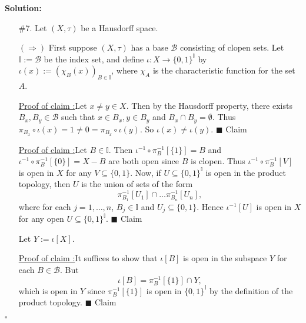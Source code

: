 \documentclass[12pt]{article}
\newcounter{ProofCounter}
\newcounter{ClaimCounter}[ProofCounter]
\newenvironment{Solution}{\stepcounter{ProofCounter}\textbf{Solution:}}{\hfill$\square$}
\newenvironment{claim}[1]{\vspace{1mm}\stepcounter{ClaimCounter}\par\noindent\underline{\bf Claim \theClaimCounter:}\space#1}{}
\newenvironment{claimproof}[1]{\par\noindent\underline{Proof of claim \theClaimCounter:}\space#1}{\hfill $\blacksquare$ Claim \theClaimCounter}
\begin{document}
\begin{Solution}
\begin{enumerate}
      By Claim 3 we can now apply the exact same argument as in the proof of Urysohn's lemma to derive a continuous function $\tilde{f} : X \rightarrow [0,1]$
      such that $\tilde{f}\big|_{K} \equiv 0$ and $\tilde{f}\big|_{F} \equiv 1$. Then by taking $f := 1 - \tilde{f}$, we are done.

    \item[\#7.] Let $(X, \tau)$ be a Hausdorff space.

      $(\Rightarrow)$ First suppose $(X, \tau)$ has a base $\mathcal{B}$ consisting of clopen sets. Let $\mathbb{I} := \mathcal{B}$ be the index set,
      and define $\iota : X \rightarrow \{0,1\}^{\mathbb{I}}$ by $\iota(x) := \left( \chi_{B}(x) \right)_{B\in\mathbb{I}}$, where $\chi_{A}$ is the
      characteristic function for the set $A$.

      \begin{claimproof}
        Let $x \neq y \in X$. Then by the Hausdorff property, there exists $B_x, B_y \in \mathcal{B}$ such that $x \in B_x, y \in B_y$ and $B_x \cap
        B_y = \emptyset$. Thus $\pi_{B_x}\circ\iota(x) = 1 \neq 0 = \pi_{B_x}\circ \iota(y)$. So $\iota(x) \neq \iota(y)$.
      \end{claimproof}

      \begin{claimproof}
        Let $B \in \mathbb{I}$. Then $\iota^{-1} \circ \pi_{B}^{-1}[\{1\}] = B$ and $\iota^{-1} \circ \pi_{B}^{-1}[\{0\}] = X - B$ are both open since $B$ is clopen.
        Thus $\iota^{-1}\circ\pi_{B}^{-1}[V]$ is open in $X$ for any $V \subseteq \{0,1\}$. Now, if $U \subseteq \{0,1\}^{\mathbb{I}}$ is open in the product
        topology, then $U$ is the union of sets of the form 
        \[
          \pi_{B_1}^{-1}[U_1] \cap \dots \pi_{B_n}^{-1}[U_n],
        \]
        where for each $j = 1, \dots, n$, $B_j \in \mathbb{I}$ and $U_j \subseteq \{0,1\}$.  Hence $\iota^{-1}[U]$ is open in $X$ for any open $U \subseteq
        \{0,1\}^{\mathbb{I}}$.
      \end{claimproof}

      Let $Y := \iota[X]$.

      \begin{claimproof}
        It suffices to show that $\iota[B]$ is open in the subspace $Y$ for each $B \in \mathcal{B}$.
        But 
        \[
          \iota[B] = \pi_{B}^{-1}[\{1\}] \cap Y,
        \]
        which is open in $Y$ since $\pi_B^{-1}[\{1\}]$ is open in $\{0,1\}^{\mathbb{I}}$ by the definition of the product topology.
      \end{claimproof}


\end{enumerate}
\end{Solution}
\end{document}
